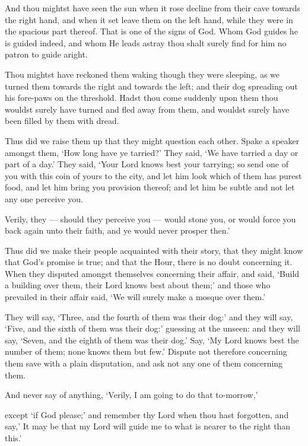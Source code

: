 \documentclass[fontsize=14pt, letterpaper, notitlepage, openany, DIV=12]{scrbook} %
\begin{document}
\noindent[18:17]
And thou mightst have seen the sun when it rose decline from their cave towards the right
hand, and when it set leave them on the left hand, while they were in the spacious part thereof.
That is one of the signs of God. Whom God guides he is guided indeed, and whom He leads
astray thou shalt surely find for him no patron to guide aright.

\noindent[18:18]
Thou mightst have reckoned them waking though they were sleeping, as we turned them
towards the right and towards the left; and their dog spreading out his fore-paws on the
threshold. Hadst thou come suddenly upon them thou wouldst surely have turned and fled away
from them, and wouldst surely have been filled by them with dread.

\noindent[18:19]
Thus did we raise them up that they might question each other. Spake a speaker amongst
them, `How long have ye tarried?' They said, `We have tarried a day or part of a day.' They said,
`Your Lord knows best your tarrying; so send one of you with this coin of yours to the city, and
let him look which of them has purest food, and let him bring you provision thereof; and let him
be subtle and not let any one perceive you.

\noindent[18:20]
Verily, they --- should they perceive you --- would stone you, or would force you back
again unto their faith, and ye would never prosper then.'

\noindent[18:21]
Thus did we make their people acquainted with their story, that they might know that
God's promise is true; and that the Hour, there is no doubt concerning it. When they disputed
amongst themselves concerning their affair, and said, `Build a building over them, their Lord
knows best about them;' and those who prevailed in their affair said, `We will surely make a
mosque over them.'

\noindent[18:22]
They will say, `Three, and the fourth of them was their dog:' and they will say, `Five, and
the sixth of them was their dog:' guessing at the unseen: and they will say, `Seven, and the eighth
of them was their dog.' Say, `My Lord knows best the number of them; none knows them but
few.' Dispute not therefore concerning them save with a plain disputation, and ask not any one of
them concerning them.

\noindent[18:23]
And never say of anything, `Verily, I am going to do that to-morrow,'

\noindent[18:24]
except `if God please;' and remember thy Lord when thou hast forgotten, and say,' It
may be that my Lord will guide me to what is nearer to the right than this.'
\end{document}
